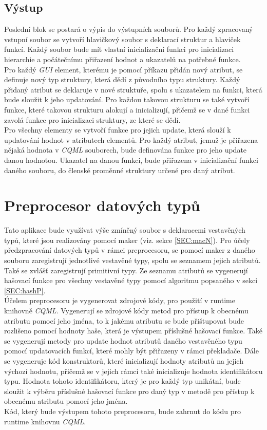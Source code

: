 \documentclass[11pt,twoside,a4paper]{book}
\begin{document}
{{\begin{ttemize}
{{\subsection{Výstup}
Poslední blok se postará o výpis do výstupních souborů. Pro každý zpracovaný vstupní soubor se vytvoří hlavičkový soubor s deklarací struktur a hlaviček funkcí. Každý soubor bude mít vlastní inicializační funkci pro inicializaci hierarchie a počátečnímu přiřazení hodnot a ukazatelů na potřebné funkce.\\
Pro každý \textit{GUI} element, kterému je pomocí příkazu přidán nový atribut, se definuje nový typ struktury, která dědí z původního typu struktury. Každý přidaný atribut se deklaruje v nové struktuře, spolu s ukazatelem na funkci, která bude sloužit k jeho updatování. Pro každou takovou strukturu se také vytvoří funkce, které takovou strukturu alokují a inicializují, přičemž se v dané funkci zavolá funkce pro inicializaci struktury, ze které se dědí.\\
Pro všechny elementy se vytvoří funkce pro jejich update, která slouží k updatování hodnot v atributech elementů. Pro každý atribut, jemuž je přiřazena nějaká hodnota v \textit{CQML} souborech, bude definována funkce pro jeho update danou hodnotou. Ukazatel na danou funkci, bude přiřazena v inicializační funkci daného souboru, do členské proměnné struktury určené pro daný atribut.\\


\section{\label{SEC:prepN}Preprocesor datových typů}
Tato aplikace bude využívat výše zmíněný soubor s deklaracemi vestavěných typů, které jsou realizovány pomocí maker (viz. sekce \ref{SEC:macN}). Pro účely předzpracování datových typů v rámci preprocesoru, se pomocí maker z daného souboru zaregistrují jednotlivé vestavěné typy, spolu se seznamem jejich atributů. Také se zvlášť zaregistrují primitivní typy. Ze seznamu atributů se vygenerují hašovací funkce pro všechny vestavěné typy pomocí algoritmu popsaného v sekci \ref{SEC:hashP}.\\
Účelem preprocesoru je vygenerovat zdrojové kódy, pro použití v runtime knihovně \textit{CQML}. Vygenerují se zdrojové kódy metod pro přístup k obecnému atributu pomocí jeho jména, to k jakému atributu se bude přištupovat bude rozlišeno pomocí hodnoty haše, která je výstupem příslušné hašovací funkce. Také se vygenerují metody pro update hodnot atributů daného vestavěného typu pomocí updatovacích funkcí, které mohly být přiřazeny v rámci překladače. Dále se vygeneruje kód konstruktorů, které inicializují hodnoty atributů na jejich výchozí hodnotu, přičemž se v jejich rámci také inicializuje hodnota identifikátoru typu. Hodnota tohoto identifikátoru, který je pro každý typ unikátní, bude sloužit k výběru příslušné hašovací funkce pro daný typ v metodě pro přístup k obecnému atributu pomocí jeho jména.\\
Kód, který bude výstupem tohoto preprocesoru, bude zahrnut do kódu pro runtime knihovnu \textit{CQML}.\\


}}
\end{ttemize}}}
\end{document}
